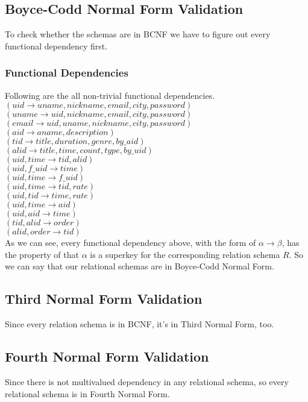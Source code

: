 \documentclass[letterpaper, 12pt]{report}
\begin{document}
	\subsection{Boyce-Codd Normal Form Validation}
	To check whether the schemas are in BCNF we have to figure out every functional dependency first.
	\subsubsection{Functional Dependencies}
	Following are the all non-trivial functional dependencies.\\
	$(uid\to uname, nickname, email, city, password)$\\
	$(uname\to uid, nickname, email, city, password)$\\
	$(email\to uid, uname ,nickname, city, password)$\\
	$(aid\to aname, description)$\\
	$(tid\to title, duration, genre, by\_aid)$\\
	$(alid\to title, time, count, type, by\_uid)$\\
	$(uid, time\to tid, alid)$\\
	$(uid, f\_uid\to time)$\\
	$(uid, time\to f\_uid)$\\
	$(uid, time\to tid, rate)$\\
	$(uid, tid\to time, rate)$\\
	$(uid, time\to aid)$\\
	$(uid, aid\to time)$\\
	$(tid, alid\to order)$\\
	$(alid, order\to tid)$\\
	As we can see, every functional dependency above, with the form of $\alpha \to \beta$, has the property of that $\alpha$ is a superkey for the corresponding relation schema $R$. So we can say that our relational schemas are in Boyce-Codd Normal Form.
	
	\subsection{Third Normal Form Validation}
	Since every relation schema is in BCNF, it's in Third Normal Form, too.
	\subsection{Fourth Normal Form Validation}
	Since there is not multivalued dependency in any relational schema, so every relational schema is in Fourth Normal Form.
	
\end{document}
